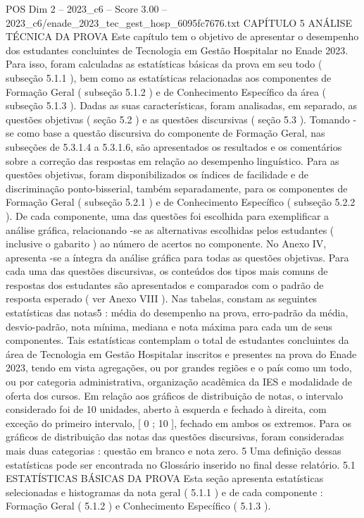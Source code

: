 \begin{textsample}{POS Dim 2 – 2023\_c6 – Score 3.00 – 2023\_c6/enade\_2023\_tec\_gest\_hosp\_6095fc7676.txt}  \label{ex:f2_pos_162}
CAPÍTULO 5 ANÁLISE TÉCNICA DA PROVA Este capítulo tem o objetivo de apresentar o desempenho dos estudantes concluintes de Tecnologia em Gestão Hospitalar no Enade 2023.
Para isso, foram calculadas as estatísticas básicas da prova em seu todo ( subseção 5.1.1 ), bem como as estatísticas relacionadas aos componentes de Formação Geral ( subseção 5.1.2 ) e de Conhecimento Específico da área ( subseção 5.1.3 ).
Dadas as suas características, foram analisadas, em separado, as questões objetivas ( seção 5.2 ) e as questões discursivas ( seção 5.3 ).
Tomando -se como base a questão discursiva do componente de Formação Geral, nas subseções de 5.3.1.4 a 5.3.1.6, são apresentados os resultados e os comentários sobre a correção das respostas em relação ao desempenho linguístico.
Para as questões objetivas, foram disponibilizados os índices de facilidade e de discriminação ponto-bisserial, também separadamente, para os componentes de Formação Geral ( subseção 5.2.1 ) e de Conhecimento Específico ( subseção 5.2.2 ).
De cada componente, uma das questões foi escolhida para exemplificar a análise gráfica, relacionando -se as alternativas escolhidas pelos estudantes ( inclusive o gabarito ) ao número de acertos no componente.
No Anexo IV, apresenta -se a íntegra da análise gráfica para todas as questões objetivas.
Para cada uma das questões discursivas, os conteúdos dos tipos mais comuns de respostas dos estudantes são apresentados e comparados com o padrão de resposta esperado ( ver Anexo VIII ).
Nas tabelas, constam as seguintes estatísticas das notas5 : média do desempenho na prova, erro-padrão da média, desvio-padrão, nota mínima, mediana e nota máxima para cada um de seus componentes.
Tais estatísticas contemplam o total de estudantes concluintes da área de Tecnologia em Gestão Hospitalar inscritos e presentes na prova do Enade 2023, tendo em vista agregações, ou por grandes regiões e o país como um todo, ou por categoria administrativa, organização acadêmica da IES e modalidade de oferta dos cursos.
Em relação aos gráficos de distribuição de notas, o intervalo considerado foi de 10 unidades, aberto à esquerda e fechado à direita, com exceção do primeiro intervalo, [ 0 ; 10 ], fechado em ambos os extremos.
Para os gráficos de distribuição das notas das questões discursivas, foram consideradas mais duas categorias : questão em branco e nota zero. 5 Uma definição dessas estatísticas pode ser encontrada no Glossário inserido no final desse relatório. 5.1 ESTATÍSTICAS BÁSICAS DA PROVA Esta seção apresenta estatísticas selecionadas e histogramas da nota geral ( 5.1.1 ) e de cada componente : Formação Geral ( 5.1.2 ) e Conhecimento Específico ( 5.1.3 ).

\end{textsample}
